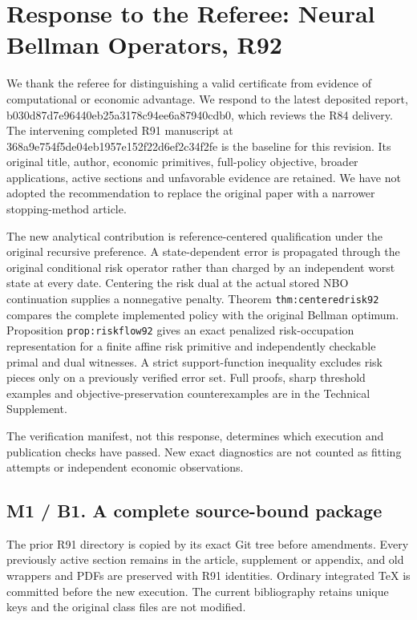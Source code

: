 \hypertarget{response-to-the-referee-neural-bellman-operators-r92}{%
\section{Response to the Referee: Neural Bellman Operators,
R92}\label{response-to-the-referee-neural-bellman-operators-r92}}

We thank the referee for distinguishing a valid certificate from
evidence of computational or economic advantage. We respond to the
latest deposited report, b030d87d7e96440eb25a3178c94ee6a87940cdb0, which
reviews the R84 delivery. The intervening completed R91 manuscript at
368a9e754f5de04eb1957e152f22d6ef2c34f2fe is the baseline for this
revision. Its original title, author, economic primitives, full-policy
objective, broader applications, active sections and unfavorable
evidence are retained. We have not adopted the recommendation to replace
the original paper with a narrower stopping-method article.

The new analytical contribution is reference-centered qualification
under the original recursive preference. A state-dependent error is
propagated through the original conditional risk operator rather than
charged by an independent worst state at every date. Centering the risk
dual at the actual stored NBO continuation supplies a nonnegative
penalty. Theorem \texttt{thm:centeredrisk92} compares the complete
implemented policy with the original Bellman optimum. Proposition
\texttt{prop:riskflow92} gives an exact penalized risk-occupation
representation for a finite affine risk primitive and independently
checkable primal and dual witnesses. A strict support-function
inequality excludes risk pieces only on a previously verified error set.
Full proofs, sharp threshold examples and objective-preservation
counterexamples are in the Technical Supplement.

The verification manifest, not this response, determines which execution
and publication checks have passed. New exact diagnostics are not
counted as fitting attempts or independent economic observations.

\hypertarget{m1-b1.-a-complete-source-bound-package}{%
\subsection{M1 / B1. A complete source-bound
package}\label{m1-b1.-a-complete-source-bound-package}}

The prior R91 directory is copied by its exact Git tree before
amendments. Every previously active section remains in the article,
supplement or appendix, and old wrappers and PDFs are preserved with R91
identities. Ordinary integrated TeX is committed before the new
execution. The current bibliography retains unique keys and the original
class files are not modified.

